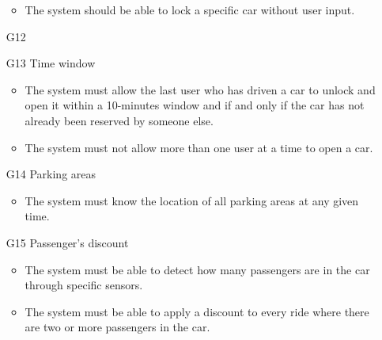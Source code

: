 \begin{itemize}
\begin{itemize}
			\item The system should be able to lock a specific car without user input. %
		\end{itemize}
	\item [G12] %
	\item [G13] Time window %
		\begin{itemize}
			\item The system must allow the last user who has driven a car to unlock and open it within a 10-minutes window and if and only if the car has not already been reserved by someone else.
			\item The system must not allow more than one user at a time to open a car.
		\end{itemize}
	\item [G14] Parking areas %
		\begin{itemize}
			\item The system must know the location of all parking areas at any given time. 
		\end{itemize}
	\item [G15] Passenger's discount %
		\begin{itemize}
			\item The system must be able to detect how many passengers are in the car through specific sensors.
			\item The system must be able to apply a discount to every ride where there are two or more passengers in the car.
		\end{itemize}
	
	
	

\end{itemize}
